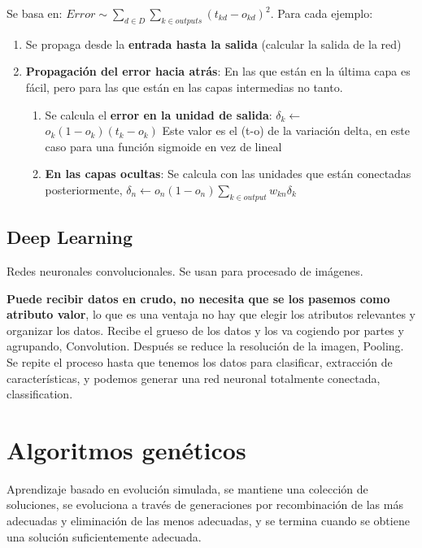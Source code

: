 \documentclass[12pt, twoside, openright]{report} %
\begin{document}
Se basa en: $Error \sim \sum _{d \in D} \sum_{k \in outputs} (t_{kd}-o_{kd})^2$. Para cada ejemplo:

\begin{enumerate}
	\def\labelenumi{\arabic{enumi}.}
	\item Se propaga desde la \textbf{entrada hasta la salida} (calcular la salida de la red)
	\pagebreak
	\item \textbf{Propagación del error hacia atrás}: En las que están en la última capa es fácil, pero para las que están en las capas intermedias no tanto.

	      \begin{enumerate}
		      \def\labelenumii{\arabic{enumii}.}
		      \item Se calcula el \textbf{error en la unidad de salida}: \(\delta_k \leftarrow\) \(o_k(1-o_k)(t_k-o_k)\) Este valor es el (t-o) de la variación delta, en este caso para una función sigmoide en vez de lineal
		      \item \textbf{En las capas ocultas}: Se calcula con las unidades que están conectadas posteriormente, \(\delta_n \leftarrow o_n(1-o_n)\sum_{k \in output} w_{kn}\delta_k\)
	      \end{enumerate}
\end{enumerate}

\subsection{Deep Learning}

Redes neuronales convolucionales. Se usan para procesado de imágenes.

\textbf{Puede recibir datos en crudo, no necesita que se los pasemos como atributo valor}, lo que es una ventaja no hay que elegir los atributos relevantes y organizar los datos. Recibe el grueso de los datos y los va cogiendo por partes y agrupando, Convolution. Después se reduce la resolución de la imagen, Pooling. Se repite el proceso hasta que tenemos los datos para clasificar, extracción de características, y podemos generar una red neuronal totalmente conectada, classification.

\section{Algoritmos genéticos}
\begin{figure}[H]
	{\def\svgwidth{.9\textwidth}
	}
\end{figure}
Aprendizaje basado en evolución simulada, se mantiene una colección de soluciones, se evoluciona a través de generaciones por recombinación de las más adecuadas y eliminación de las menos adecuadas, y se termina cuando se obtiene una solución suficientemente adecuada.
\end{document}
